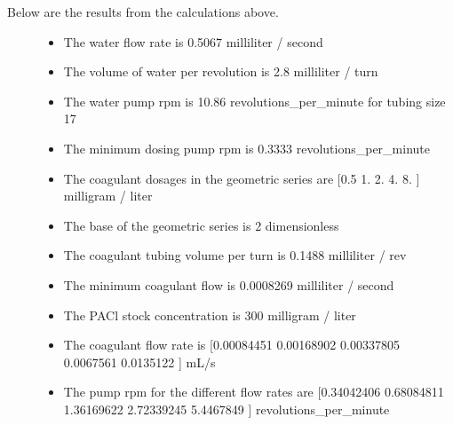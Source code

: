 \documentclass[letterpaper,10pt,english]{sphinxmanual}
\begin{document}
\begin{description}
\item[{Below are the results from the calculations above.}] \leavevmode\begin{itemize}
\item {} 
The water flow rate is 0.5067 milliliter / second

\item {} 
The volume of water per revolution is 2.8 milliliter / turn

\item {} 
The water pump rpm is 10.86 revolutions\_per\_minute for tubing size 17

\item {} 
The minimum dosing pump rpm is 0.3333 revolutions\_per\_minute

\item {} 
The coagulant dosages in the geometric series are {[}0.5 1.  2.  4.  8. {]} milligram / liter

\item {} 
The base of the geometric series is 2 dimensionless

\item {} 
The coagulant tubing volume per turn is 0.1488 milliliter / rev

\item {} 
The minimum coagulant flow is 0.0008269 milliliter / second

\item {} 
The PACl stock concentration is 300 milligram / liter

\item {} 
The coagulant flow rate is {[}0.00084451 0.00168902 0.00337805 0.0067561  0.0135122 {]} mL/s

\item {} 
The pump rpm for the different flow rates are {[}0.34042406 0.68084811 1.36169622 2.72339245 5.4467849 {]} revolutions\_per\_minute

\end{itemize}

\end{description}
\end{document}

